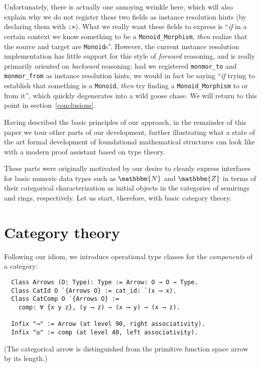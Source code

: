 \documentclass[a4paper,10pt,runningheads]{llncs}
\newcommand{\N}{\ensuremath{\mathbbm{N}}}
\newcommand{\Z}{\ensuremath{\mathbbm{Z}}}
\begin{document}
Unfortunately, there is actually one annoying wrinkle here, which will also explain why we do not register these two fields as instance resolution hints (by declaring them with \lstinline|:>|). What we really want these fields to express is ``\emph{if} in a certain context we know something to be a \lstinline|Monoid_Morphism|, \emph{then} realize that the source and target are \lstinline|Monoid|s''. However, the current instance resolution implementation has little support for this style of \emph{forward} reasoning, and is really primarily oriented on \emph{backward} reasoning: had we registered \lstinline|monmor_to| and \lstinline|monmor_from| as instance resolution hints, we would in fact be saying ``\emph{if} trying to establish that something is a \lstinline|Monoid|, \emph{then} try finding a \lstinline|Monoid_Morphism| to or from it'', which quickly degenerates into a wild goose chase. We will return to this point in section~\ref{conclusions}.

Having described the basic principles of our approach, in the remainder of this paper we tour other parts of our development, further illustrating what a state of the art formal development of foundational mathematical structures can look like with a modern proof assistant based on type theory.

These parts were originally motivated by our desire to cleanly express interfaces for basic numeric data types such as $\N$ and $\Z$ in terms of their categorical characterization as initial objects in the categories of semirings and rings, respectively. Let us start, therefore, with basic category theory.

\section{Category theory}\label{cat}

Following our idiom, we introduce operational type classes for the \emph{components} of a category:
\begin{lstlisting}
  Class Arrows (O: Type): Type := Arrow: O → O → Type.
  Class CatId O `{Arrows O} := cat_id: `(x ⟶ x).
  Class CatComp O `{Arrows O} :=
    comp: ∀ {x y z}, (y ⟶ z) → (x ⟶ y) → (x ⟶ z).

  Infix "⟶" := Arrow (at level 90, right associativity).
  Infix "◎" := comp (at level 40, left associativity).
\end{lstlisting}
(The categorical arrow is distinguished from the primitive function space arrow by its length.)
\end{document}
